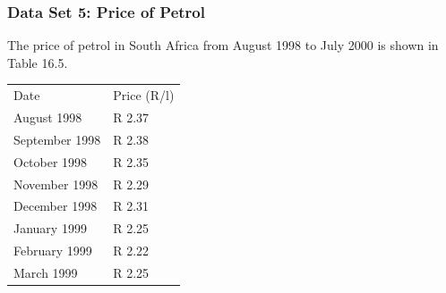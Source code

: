 \begin{description}[noitemsep]
\begin{description}[noitemsep]
            \subsubsection{ Data Set 5: Price of Petrol}
            \nopagebreak
        \label{m39403*id206845}The price of petrol in South Africa from August 1998 to July 2000 is shown in Table 16.5.\par 
          \begin{table}
        \begin{center}
      \label{m39403*uid33}
    \noindent
      \tablelasttail{}
      \begin{xtabular}[t]{|l|l|}\hline
        Date &
        Price (R/l)%
     \tabularnewline{}
        August 1998 &
        R 2.37%
     \tabularnewline{}
        September 1998 &
        R 2.38%
     \tabularnewline{}
        October 1998 &
        R 2.35%
     \tabularnewline{}
        November 1998 &
        R 2.29%
     \tabularnewline{}
        December 1998 &
        R 2.31%
     \tabularnewline{}
        January 1999 &
        R 2.25%
     \tabularnewline{}
        February 1999 &
        R 2.22%
     \tabularnewline{}
        March 1999 &
        R 2.25%
     \tabularnewline{}

\end{xtabular}
\end{center}
\end{table}
\end{description}
\end{description}
